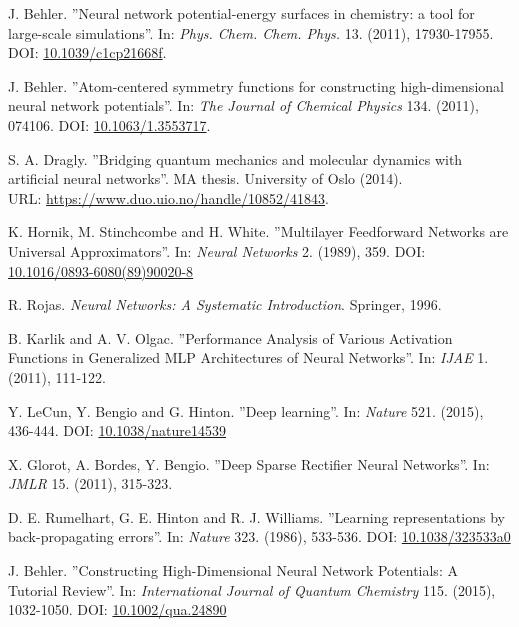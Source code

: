 \documentclass[twoside,english]{uiofysmaster}
\begin{document}
\begin{thebibliography}{56}

 J. Behler.
 ''Neural network potential-energy surfaces in chemistry: a tool for large-scale simulations''.
 In: \textit{Phys. Chem. Chem. Phys.} 13. (2011), 17930-17955. 
 DOI: \href{http://dx.doi.org/10.1039/c1cp21668f}{10.1039/c1cp21668f}. 
 
 J. Behler.
 ''Atom-centered symmetry functions for constructing high-dimensional neural network potentials''.
 In: \textit{The Journal of Chemical Physics} 134. (2011), 074106. 
 DOI: \href{http://dx.doi.org/10.1063/1.3553717}{10.1063/1.3553717}.
 
 S. A. Dragly.
 ''Bridging quantum mechanics and molecular dynamics with artificial neural networks''.
 MA thesis. University of Oslo (2014). \\
 URL: \href{https://www.duo.uio.no/handle/10852/41843}{https://www.duo.uio.no/handle/10852/41843}.

 K. Hornik, M. Stinchcombe and H. White.
 ''Multilayer Feedforward Networks are Universal Approximators''.
 In: \textit{Neural Networks} 2. (1989), 359. 
 DOI: \href{https://doi.org/10.1016/0893-6080(89)90020-8}{10.1016/0893-6080(89)90020-8}
 
 R. Rojas. 
 \textit{Neural Networks: A Systematic Introduction}.
 Springer, 1996.
 
 B. Karlik and A. V. Olgac.
 ''Performance Analysis of Various Activation Functions in Generalized MLP Architectures of Neural Networks''.
 In: \textit{IJAE} 1. (2011), 111-122.
 
 Y. LeCun, Y. Bengio and G. Hinton.
 ''Deep learning''.
 In: \textit{Nature} 521. (2015), 436-444. 
 DOI: \href{http://dx.doi.org/10.1038/nature14539}{10.1038/nature14539}
 
 X. Glorot, A. Bordes, Y. Bengio.
 ''Deep Sparse Rectifier Neural Networks''.
 In: \textit{JMLR} 15. (2011), 315-323.
 
 D. E. Rumelhart, G. E. Hinton and R. J. Williams.
 ''Learning representations by back-propagating errors''.
 In: \textit{Nature} 323. (1986), 533-536.
 DOI: \href{http://dx.doi.org/10.1038/323533a0}{10.1038/323533a0}
 
 J. Behler.
 ''Constructing High-Dimensional Neural Network Potentials: A Tutorial Review''.
 In: \textit{International Journal of Quantum Chemistry} 115. (2015), 1032-1050.
 DOI: \href{http://dx.doi.org/10.1002/qua.24890}{10.1002/qua.24890}
 

\end{thebibliography}
\end{document}
